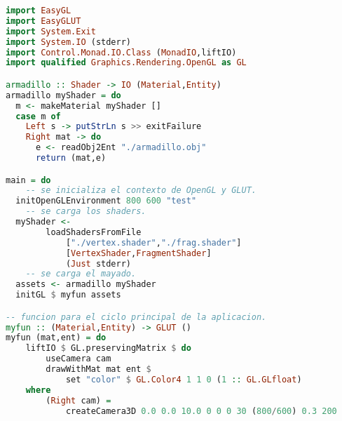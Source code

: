 \begin{lstlisting}[label={Ejemplo1},caption={Ejemplo - Mostrando armadillo},language=Haskell]
import EasyGL
import EasyGLUT
import System.Exit
import System.IO (stderr)
import Control.Monad.IO.Class (MonadIO,liftIO)
import qualified Graphics.Rendering.OpenGL as GL

armadillo :: Shader -> IO (Material,Entity)
armadillo myShader = do
  m <- makeMaterial myShader []
  case m of
    Left s -> putStrLn s >> exitFailure
    Right mat -> do
      e <- readObj2Ent "./armadillo.obj"
      return (mat,e)

main = do
	-- se inicializa el contexto de OpenGL y GLUT.
  initOpenGLEnvironment 800 600 "test"
	-- se carga los shaders.
  myShader <-
		loadShadersFromFile
			["./vertex.shader","./frag.shader"]
			[VertexShader,FragmentShader]
			(Just stderr)
	-- se carga el mayado.
  assets <- armadillo myShader
  initGL $ myfun assets

-- funcion para el ciclo principal de la aplicacion.
myfun :: (Material,Entity) -> GLUT ()
myfun (mat,ent) = do
	liftIO $ GL.preservingMatrix $ do
		useCamera cam
		drawWithMat mat ent $
			set "color" $ GL.Color4 1 1 0 (1 :: GL.GLfloat)
	where
		(Right cam) =
			createCamera3D 0.0 0.0 10.0 0 0 0 30 (800/600) 0.3 200
\end{lstlisting}

